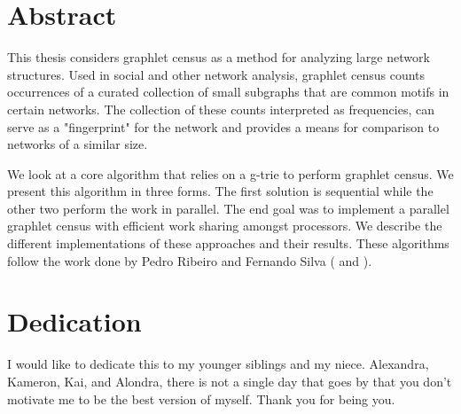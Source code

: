 \documentclass[12pt,twoside]{reedthesis}
\begin{document}
    \tableofcontents
   \listofalgorithms
   
    \listoftables
    \listoffigures
   
    

    \chapter*{Abstract}
    
This thesis considers graphlet census as a method for analyzing large network structures. Used in social and other network analysis, graphlet census counts occurrences of a curated collection of small subgraphs that are common motifs in certain networks. The collection of these counts interpreted as frequencies, can serve as a "fingerprint" for the network and provides a means for comparison to networks of a similar size.

We look at a core algorithm that relies on a g-trie to perform graphlet census. We present this algorithm in three forms. The first solution is sequential while the other two perform the work in parallel. The end goal was to implement a parallel graphlet census with efficient work sharing amongst processors. We describe the different implementations of these approaches and their results. These algorithms follow the work done by Pedro Ribeiro and Fernando Silva (\cite{g_tries} and \cite{par_t}).

	\chapter*{Dedication}
	I would like to dedicate this to my younger siblings and my niece. Alexandra, Kameron, Kai, and Alondra, there is not a single day that goes by that you don't motivate me to be the best version of myself. Thank you for being you.

  \mainmatter %
  \pagestyle{fancyplain} %

\end{document}
